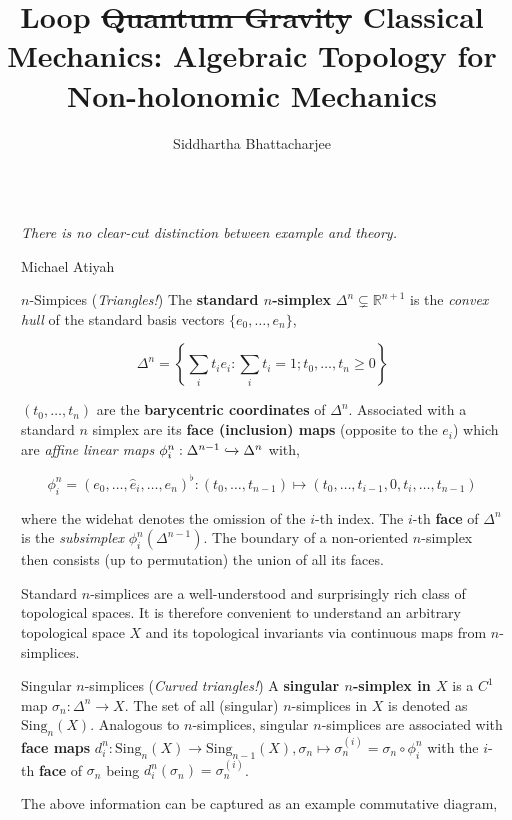 \documentclass[final]{beamer}
\title{Loop \sout{Quantum Gravity} Classical Mechanics: Algebraic Topology for Non-holonomic Mechanics}
\author{Siddhartha Bhattacharjee}
\institute[shortinst]{University of Waterloo}
\newlength{\sepwidth}
\newlength{\colwidth}
\newcommand{\separatorcolumn}{\begin{column}{\sepwidth}\end{column}}
\newcommand{\sing}{\text{Sing}}
\newcommand{\inc}[1]{\xhookrightarrow{#1}}
\theoremstyle{remark}
\begin{document}
\begin{frame}[t]
\begin{columns}[t]
\separatorcolumn

\begin{column}{\colwidth}

\epigraph{\textit{There is no clear-cut distinction between example and theory.}}{Michael Atiyah}

\begin{block}{$n$-Simpices (\emph{Triangles!})}
The \textbf{standard $n$-simplex} $\Delta^n \subsetneq \mathbb{R}^{n+1}$ is the \emph{convex hull} of the standard basis vectors $\{ e_0, \dots, e_n \}$,

$$\Delta^n = \left\{ \sum_i t_i e_i : \sum_i t_i = 1; t_0, \dots, t_n \geq 0 \right\}$$

$(t_0, \dots, t_n)$ are the \textbf{barycentric coordinates} of $\Delta^n$. Associated with a standard $n$ simplex are its \textbf{face (inclusion) maps} (opposite to the $e_i$) which are \emph{affine linear maps} $\phi^n_i : \Delta^{n-1} \inc{} \Delta^n$ with,

$$\phi^n_i = (e_0, \dots, \widehat{e}_i, \dots, e_n)^\flat : (t_0, \dots, t_{n-1}) \mapsto (t_0, \dots, t_{i-1}, 0, t_i, \dots, t_{n-1})$$

where the widehat denotes the omission of the $i$-th index. The $i$-th \textbf{face} of $\Delta^n$ is the \emph{subsimplex} $\phi^n_i(\Delta^{n-1})$. The boundary of a non-oriented $n$-simplex then consists (up to permutation) the union of all its faces.

Standard $n$-simplices are a well-understood and surprisingly rich class of topological spaces. It is therefore convenient to understand an arbitrary topological space $X$ and its topological invariants via continuous maps from $n$-simplices.
\end{block}

\begin{block}{Singular $n$-simplices (\emph{Curved triangles!})}
A \textbf{singular $n$-simplex in $X$} is a $C^1$ map $\sigma_n : \Delta^n \to X$. The set of all (singular) $n$-simplices in $X$ is denoted as $\sing_n(X)$. Analogous to $n$-simplices, singular $n$-simplices are associated with \textbf{face maps} $d^n_i : \sing_n(X) \to \sing_{n-1}(X), \sigma_n \mapsto \sigma_n^{(i)} = \sigma_n \circ \phi^n_i$ with the $i$-th \textbf{face} of $\sigma_n$ being $d^n_i(\sigma_n) = \sigma_n^{(i)}$.

The above information can be captured as an example commutative diagram,


\end{block}
\end{column}
\end{columns}
\end{frame}
\end{document}
